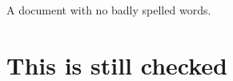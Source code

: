 \documentclass{report}
\begin{document}
A document with no badly spelled words.


\chapter{This is still checked}\label{chap:1}
\end{document}
